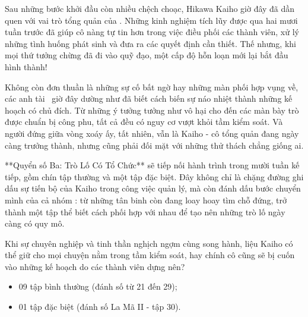 \documentclass[main.tex]{subfiles}
\begin{document}
Sau những bước khởi đầu còn nhiều chệch choạc, Hikawa Kaiho giờ đây đã dần quen với vai trò tổng quản của \hls. Những kinh nghiệm tích lũy được qua hai mươi tuần trước đã giúp cô nàng tự tin hơn trong việc điều phối các thành viên, xử lý những tình huống phát sinh và đưa ra các quyết định cần thiết. Thế nhưng, khi mọi thứ tưởng chừng đã đi vào quỹ đạo, một cấp độ hỗn loạn mới lại bắt đầu hình thành!

Không còn đơn thuần là những sự cố bất ngờ hay những màn phối hợp vụng về, các anh tài \hls\ giờ đây dường như đã biết cách biến sự náo nhiệt thành những kế hoạch có chủ đích. Từ những ý tưởng tưởng như vô hại cho đến các màn bày trò được chuẩn bị công phu, tất cả đều có nguy cơ vượt khỏi tầm kiểm soát. Và người đứng giữa vòng xoáy ấy, tất nhiên, vẫn là Kaiho - cô tổng quản đang ngày càng trưởng thành, nhưng cũng phải đối mặt với những thử thách chẳng giống ai.

**Quyển số Ba: Trò Lố Có Tổ Chức** sẽ tiếp nối hành trình trong mười tuần kế tiếp, gồm chín tập thường và một tập đặc biệt. Đây không chỉ là chặng đường ghi dấu sự tiến bộ của Kaiho trong công việc quản lý, mà còn đánh dấu bước chuyển mình của cả nhóm \hls : từ những tân binh còn đang loay hoay tìm chỗ đứng, trở thành một tập thể biết cách phối hợp với nhau để tạo nên những trò lố ngày càng có quy mô.

Khi sự chuyên nghiệp và tinh thần nghịch ngợm cùng song hành, liệu Kaiho có thể giữ cho mọi chuyện nằm trong tầm kiểm soát, hay chính cô cũng sẽ bị cuốn vào những kế hoạch do các thành viên dựng nên?

{}
\begin{itemize}
    \item 09 tập bình thường (đánh số từ 21 đến 29);
    \item 01 tập đặc biệt (đánh số La Mã II - tập 30).
\end{itemize}
\end{document}
